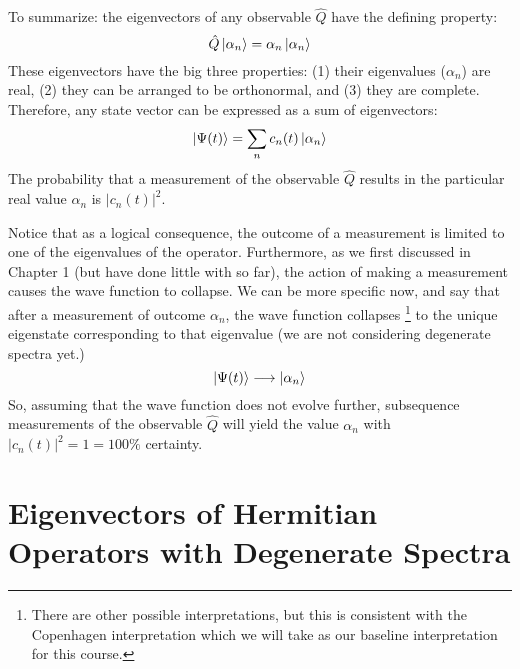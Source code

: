 \documentclass[12pt]{book}
\begin{document}
To summarize:  the eigenvectors of any observable $\hat{Q}$ have the defining property:
$$\hat{Q} \ket{\alpha_n} = \alpha_n \ket{\alpha_n}$$
These eigenvectors have the big three properties: (1) their eigenvalues ($\alpha_n$) are real, (2) they can be arranged to be orthonormal, and (3) they are complete.  Therefore, any state vector can be expressed as a sum of eigenvectors:
$$\ket{\Psi(t)} = \sum_n c_n(t) \ket{\alpha_n}$$
The probability that a measurement of the observable $\hat{Q}$ results in the particular real value $\alpha_n$ is $|c_n(t)|^2$. 

Notice that as a logical consequence, the outcome of a measurement is limited to one of the eigenvalues of the operator.  Furthermore, as we first discussed in Chapter 1 (but have done little with so far), the action of making a measurement causes the wave function to collapse.  We can be more specific now, and say that after a measurement of outcome $\alpha_n$, the wave function collapses
\footnote{There are other possible interpretations, but this is consistent with the Copenhagen interpretation which we will take as our baseline interpretation for this course.} to the unique eigenstate corresponding to that eigenvalue (we are not considering degenerate spectra yet.)
$$\ket{\Psi(t)} \longrightarrow \ket{\alpha_n}$$
So, assuming that the wave function does not evolve further, subsequence measurements of the observable $\hat{Q}$ will yield the value $\alpha_n$ with $|c_n(t)|^2 = 1 = 100\%$ certainty.

\section{Eigenvectors of Hermitian Operators with Degenerate Spectra}
\end{document}
